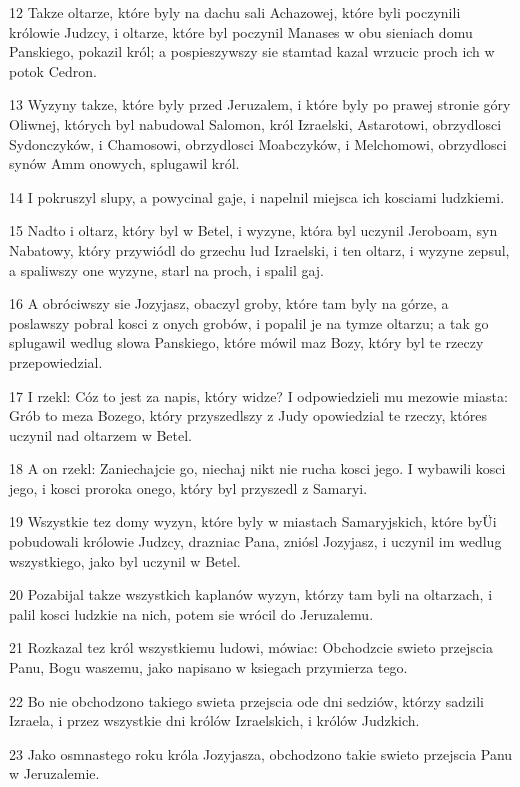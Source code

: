 \par 12 Takze oltarze, które byly na dachu sali Achazowej, które byli poczynili królowie Judzcy, i oltarze, które byl poczynil Manases w obu sieniach domu Panskiego, pokazil król; a pospieszywszy sie stamtad kazal wrzucic proch ich w potok Cedron.
\par 13 Wyzyny takze, które byly przed Jeruzalem, i które byly po prawej stronie góry Oliwnej, których byl nabudowal Salomon, król Izraelski, Astarotowi, obrzydlosci Sydonczyków, i Chamosowi, obrzydlosci Moabczyków, i Melchomowi, obrzydlosci synów Amm onowych, splugawil król.
\par 14 I pokruszyl slupy, a powycinal gaje, i napelnil miejsca ich kosciami ludzkiemi.
\par 15 Nadto i oltarz, który byl w Betel, i wyzyne, która byl uczynil Jeroboam, syn Nabatowy, który przywiódl do grzechu lud Izraelski, i ten oltarz, i wyzyne zepsul, a spaliwszy one wyzyne, starl na proch, i spalil gaj.
\par 16 A obróciwszy sie Jozyjasz, obaczyl groby, które tam byly na górze, a poslawszy pobral kosci z onych grobów, i popalil je na tymze oltarzu; a tak go splugawil wedlug slowa Panskiego, które mówil maz Bozy, który byl te rzeczy przepowiedzial.
\par 17 I rzekl: Cóz to jest za napis, który widze? I odpowiedzieli mu mezowie miasta: Grób to meza Bozego, który przyszedlszy z Judy opowiedzial te rzeczy, któres uczynil nad oltarzem w Betel.
\par 18 A on rzekl: Zaniechajcie go, niechaj nikt nie rucha kosci jego. I wybawili kosci jego, i kosci proroka onego, który byl przyszedl z Samaryi.
\par 19 Wszystkie tez domy wyzyn, które byly w miastach Samaryjskich, które byÜi pobudowali królowie Judzcy, drazniac Pana, zniósl Jozyjasz, i uczynil im wedlug wszystkiego, jako byl uczynil w Betel.
\par 20 Pozabijal takze wszystkich kaplanów wyzyn, którzy tam byli na oltarzach, i palil kosci ludzkie na nich, potem sie wrócil do Jeruzalemu.
\par 21 Rozkazal tez król wszystkiemu ludowi, mówiac: Obchodzcie swieto przejscia Panu, Bogu waszemu, jako napisano w ksiegach przymierza tego.
\par 22 Bo nie obchodzono takiego swieta przejscia ode dni sedziów, którzy sadzili Izraela, i przez wszystkie dni królów Izraelskich, i królów Judzkich.
\par 23 Jako osmnastego roku króla Jozyjasza, obchodzono takie swieto przejscia Panu w Jeruzalemie.
